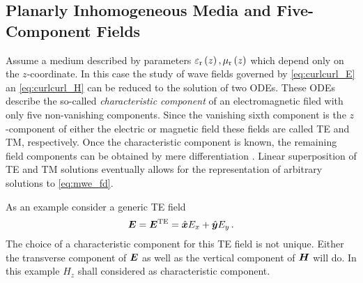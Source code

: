		
		

\subsection{Planarly Inhomogeneous Media and Five-Component Fields}
\label{subsec:five_component_filds}

Assume a medium described by parameters $\varepsilon_{\mathrm{r}}\left(z\right), \mu_{\mathrm{r}}\left(z\right)$ which depend only on the $z$-coordinate. In this case the study of wave fields governed by \eqref{eq:curlcurl_E} an \eqref{eq:curlcurl_H} can be reduced to the solution of two \acsp{ODE}. These \acsp{ODE} describe the so-called \emph{characteristic component} of an electromagnetic filed with only five non-vanishing components. Since the vanishing sixth component is the $z$-component of either the electric or magnetic field these fields are called \ac{TE} and \ac{TM}, respectively. Once the characteristic component is known, the remaining field components can be obtained by mere differentiation \cite[pp.~75]{Chew1999}. Linear superposition of \ac{TE} and \ac{TM} solutions eventually allows for the representation of arbitrary solutions to \eqref{eq:mwe_fd}.

As an example consider a generic \ac{TE} field
\begin{equation}\label{eq:TE_E_field_components}
	\pvec{E} = \pvec{E}^\te = \uv{x}E_x + \uv{y}E_y \,.
\end{equation}
The choice of a characteristic component for this \ac{TE} field is not unique. Either the transverse component of $\pvec{E}$ as well as the vertical component of $\pvec{H}$ will do. In this example $H_z$ shall considered as characteristic component.

